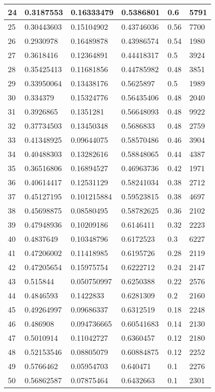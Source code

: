 \begin{longtable}{|l|l|l|l|l|l|}
24 & 0.3187553 & 0.16333479 & 0.5386801 & 0.6 & 5791 \\ \hline 
25 & 0.30443603 & 0.15104902 & 0.43746036 & 0.56 & 7700 \\ \hline 
26 & 0.2930978 & 0.16489878 & 0.43986574 & 0.54 & 1980 \\ \hline 
27 & 0.3618416 & 0.12364891 & 0.44418317 & 0.5 & 3924 \\ \hline 
28 & 0.35425413 & 0.11681856 & 0.44785982 & 0.48 & 3851 \\ \hline 
29 & 0.33950064 & 0.13438176 & 0.5625897 & 0.5 & 1989 \\ \hline 
30 & 0.334379 & 0.15324776 & 0.56435406 & 0.48 & 2040 \\ \hline 
31 & 0.3926865 & 0.1351281 & 0.56648093 & 0.48 & 9922 \\ \hline 
32 & 0.37734503 & 0.13450348 & 0.5686833 & 0.48 & 2759 \\ \hline 
33 & 0.41348925 & 0.09644075 & 0.58570486 & 0.46 & 3904 \\ \hline 
34 & 0.40488303 & 0.13282616 & 0.58848065 & 0.44 & 4387 \\ \hline 
35 & 0.36516806 & 0.16894527 & 0.46963736 & 0.42 & 1971 \\ \hline 
36 & 0.40614417 & 0.12531129 & 0.58241034 & 0.38 & 2712 \\ \hline 
37 & 0.45127195 & 0.101215884 & 0.59523815 & 0.38 & 4697 \\ \hline 
38 & 0.45698875 & 0.08580495 & 0.58782625 & 0.36 & 2102 \\ \hline 
39 & 0.47948936 & 0.10209186 & 0.6146411 & 0.32 & 2223 \\ \hline 
40 & 0.4837649 & 0.10348796 & 0.6172523 & 0.3 & 6227 \\ \hline 
41 & 0.47206002 & 0.11418985 & 0.6195726 & 0.28 & 2119 \\ \hline 
42 & 0.47205654 & 0.15975754 & 0.6222712 & 0.24 & 2147 \\ \hline 
43 & 0.515844 & 0.050750997 & 0.6250388 & 0.22 & 2576 \\ \hline 
44 & 0.4846593 & 0.1422833 & 0.6281309 & 0.2 & 2160 \\ \hline 
45 & 0.49264997 & 0.09686337 & 0.6312519 & 0.18 & 2248 \\ \hline 
46 & 0.486908 & 0.094736665 & 0.60541683 & 0.14 & 2130 \\ \hline 
47 & 0.5010914 & 0.11042727 & 0.6360457 & 0.12 & 2180 \\ \hline 
48 & 0.52153546 & 0.08805079 & 0.60884875 & 0.12 & 2252 \\ \hline 
49 & 0.5766462 & 0.05954703 & 0.640471 & 0.1 & 2276 \\ \hline 
50 & 0.56862587 & 0.07875464 & 0.6432663 & 0.1 & 2301 \\ \hline 
\end{longtable}